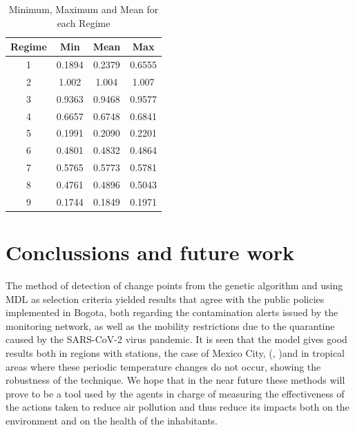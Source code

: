 \documentclass[APA,STIX1COL]{WileyNJD-v2}
\begin{document}
\begin{table}[h]
\begin{center}
\begin{tabular}{c|c|c|c}
\textbf{Regime} & \textbf{Min} & \textbf{Mean} & \textbf{Max} \\ \hline
1               & 0.1894       & 0.2379        & 0.6555       \\
2               & 1.002        & 1.004         & 1.007        \\
3               & 0.9363       & 0.9468        & 0.9577       \\
4               & 0.6657       & 0.6748        & 0.6841       \\
5               & 0.1991       & 0.2090        & 0.2201       \\
6               & 0.4801       & 0.4832        & 0.4864       \\
7               & 0.5765       & 0.5773        & 0.5781       \\
8               & 0.4761       & 0.4896        & 0.5043       \\
9               & 0.1744       & 0.1849        & 0.1971      
\end{tabular}
\end{center}
\caption{Minimum, Maximum and Mean for each Regime}
\label{table:Regime}
\end{table}



\section{Conclussions and future work}\label{sec9}

The method of detection of change points from the genetic algorithm and using MDL as selection criteria yielded results that agree with the public policies implemented in Bogota, both regarding the contamination alerts issued by the monitoring network, as well as the mobility restrictions due to the quarantine caused by the SARS-CoV-2 virus pandemic.  It is seen that the model gives good results both in regions with stations, the case of Mexico City, (\cite{Achcar10}, \cite{Achcar11})and in tropical areas where these periodic temperature changes do not occur, showing the robustness of the technique. We hope that in the near future these methods will prove to be a tool used by the agents in charge of measuring the effectiveness of the actions taken to reduce air pollution and thus reduce its impacts both on the environment and on the health of the inhabitants.





\end{document}
